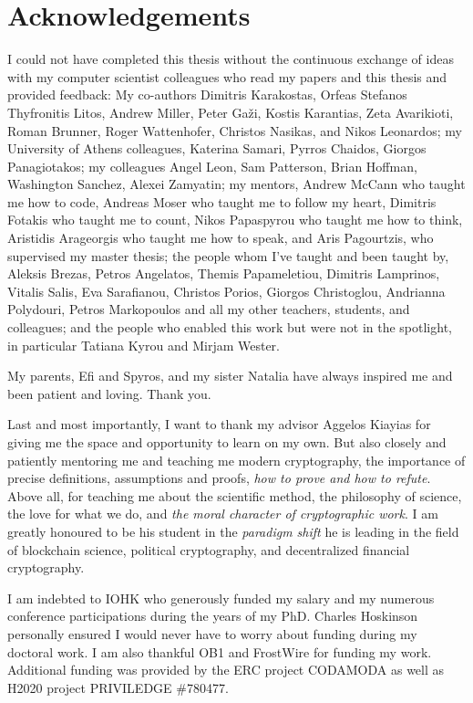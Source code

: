 \section*{Acknowledgements}

I could not have completed this thesis without the continuous exchange of ideas
with my computer scientist colleagues who read my papers and this thesis and
provided feedback: My co-authors Dimitris Karakostas, Orfeas Stefanos
Thyfronitis Litos, Andrew Miller, Peter Ga\v{z}i, Kostis Karantias, Zeta
Avarikioti, Roman Brunner, Roger Wattenhofer, Christos Nasikas, and Nikos
Leonardos; my University of Athens colleagues, Katerina Samari, Pyrros Chaidos,
Giorgos Panagiotakos; my colleagues
Angel Leon, Sam Patterson, Brian Hoffman, Washington Sanchez,
Alexei Zamyatin; my mentors, Andrew McCann who taught me how to code, Andreas
Moser who taught me to follow my heart, Dimitris Fotakis who taught me to count,
Nikos Papaspyrou who taught me how to think, Aristidis Arageorgis who taught me
how to speak, and Aris Pagourtzis, who supervised my master thesis; the people
whom I've taught and been taught by, Aleksis Brezas, Petros Angelatos, Themis
Papameletiou, Dimitris Lamprinos, Vitalis Salis, Eva Sarafianou, Christos
Porios, Giorgos Christoglou, Andrianna Polydouri, Petros Markopoulos and all my
other teachers, students, and colleagues; and the people who enabled this work
but were not in the spotlight, in particular Tatiana Kyrou and Mirjam Wester.

My parents, Efi and Spyros, and my sister Natalia have always inspired me and
been patient and loving. Thank you.

Last and most importantly, I want to thank my advisor Aggelos Kiayias for
giving me the space and opportunity to learn on my own. But also closely and
patiently mentoring me and teaching me modern cryptography, the importance of
precise definitions, assumptions and proofs, \emph{how to prove and how to
refute}. Above all, for teaching me about the scientific method, the philosophy
of science, the love for what we do, and \emph{the moral character of
cryptographic work}. I am greatly honoured to be his student in the
\emph{paradigm shift} he is leading in the field of blockchain science,
political cryptography, and decentralized financial cryptography.

I am indebted to IOHK who generously funded my salary and my numerous conference
participations during the years of my PhD. Charles Hoskinson personally ensured
I would never have to worry about funding during my doctoral work. I am also
thankful OB1 and FrostWire for funding my work. Additional funding was provided
by the ERC project CODAMODA as well as H2020 project PRIVILEDGE \#780477.
